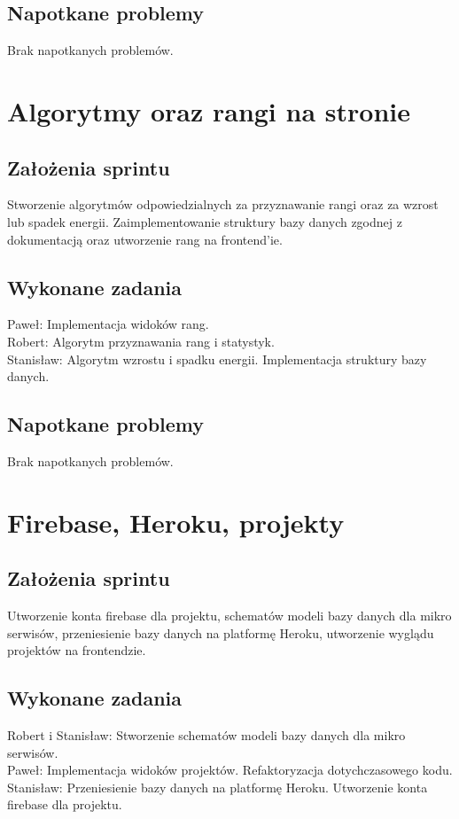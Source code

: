 \documentclass[a4paper,11pt]{report}
\begin{document}
\subsection {Napotkane problemy}
Brak napotkanych problemów.

\section {Algorytmy oraz rangi na stronie}
\label{sec:system_zarzadzania_energia_uzytkownika}
\subsection {Założenia sprintu}
Stworzenie algorytmów odpowiedzialnych za przyznawanie rangi oraz za wzrost lub spadek energii. Zaimplementowanie struktury bazy danych zgodnej z dokumentacją oraz utworzenie rang na frontend'ie.
\subsection {Wykonane zadania}
Paweł: Implementacja widoków rang. \\
Robert: Algorytm przyznawania rang i statystyk.\\
Stanisław: Algorytm wzrostu i spadku energii. Implementacja struktury bazy danych.\\
\subsection {Napotkane problemy}
Brak napotkanych problemów.

\section {Firebase, Heroku, projekty}
\label{sec:system_zarzadzania_projektami_uzytkownikow}
\subsection {Założenia sprintu}
Utworzenie konta firebase dla projektu, schematów modeli bazy danych dla mikro serwisów, przeniesienie bazy danych na platformę Heroku, utworzenie wyglądu projektów na frontendzie.
\subsection {Wykonane zadania}
Robert i Stanisław: Stworzenie schematów modeli bazy danych dla mikro serwisów.\\
Paweł: Implementacja widoków projektów. Refaktoryzacja dotychczasowego kodu. \\
Stanisław: Przeniesienie bazy danych na platformę Heroku. Utworzenie konta firebase dla projektu.\\
\end{document}
